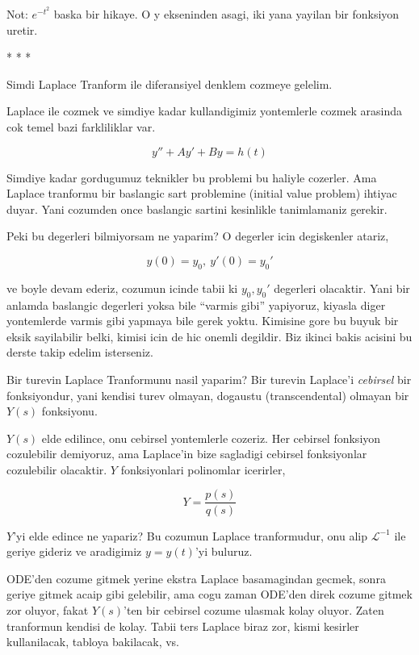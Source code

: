 \documentclass[12pt,fleqn]{article}
\begin{document}
Not: $e^{-t^2}$ baska bir hikaye. O y ekseninden asagi, iki yana yayilan bir
fonksiyon uretir. 

* * * 

Simdi Laplace Tranform ile diferansiyel denklem cozmeye gelelim. 

Laplace ile cozmek ve simdiye kadar kullandigimiz yontemlerle cozmek
arasinda cok temel bazi farkliliklar var. 

\[ y'' + Ay' + By = h(t) \]

Simdiye kadar gordugumuz teknikler bu problemi bu haliyle cozerler. Ama
Laplace tranformu bir baslangic sart problemine (initial value problem)
ihtiyac duyar. Yani cozumden once baslangic sartini kesinlikle tanimlamaniz
gerekir. 

Peki bu degerleri bilmiyorsam ne yaparim? O degerler icin degiskenler
atariz, 

\[ y(0) = y_0, \ y'(0) = y_0' \]

ve boyle devam ederiz, cozumun icinde tabii ki $y_0,y_0'$ degerleri
olacaktir. Yani bir anlamda baslangic degerleri yoksa bile ``varmis gibi''
yapiyoruz, kiyasla diger yontemlerde varmis gibi yapmaya bile gerek
yoktu. Kimisine gore bu buyuk bir eksik sayilabilir belki, kimisi icin de
hic onemli degildir. Biz ikinci bakis acisini bu derste takip edelim
isterseniz.

Bir turevin Laplace Tranformunu nasil yaparim? Bir turevin Laplace'i
{\em cebirsel} bir fonksiyondur, yani kendisi turev olmayan, dogaustu
(transcendental) olmayan bir $Y(s)$ fonksiyonu. 

$Y(s)$ elde edilince, onu cebirsel yontemlerle cozeriz. Her cebirsel
fonksiyon cozulebilir demiyoruz, ama Laplace'in bize sagladigi cebirsel
fonksiyonlar cozulebilir olacaktir. $Y$ fonksiyonlari polinomlar icerirler, 

\[ Y = \frac{p(s)}{q(s)} \]

$Y$'yi elde edince ne yapariz? Bu cozumun Laplace tranformudur, onu alip
$\mathcal{L}^{-1}$ ile geriye gideriz ve aradigimiz $y = y(t)$'yi buluruz. 

ODE'den cozume gitmek yerine ekstra Laplace basamagindan gecmek, sonra
geriye gitmek acaip gibi gelebilir, ama cogu zaman ODE'den direk cozume
gitmek zor oluyor, fakat $Y(s)$'ten bir cebirsel cozume ulasmak kolay
oluyor. Zaten tranformun kendisi de kolay. Tabii ters Laplace biraz zor,
kismi kesirler kullanilacak, tabloya bakilacak, vs. 
\end{document}
